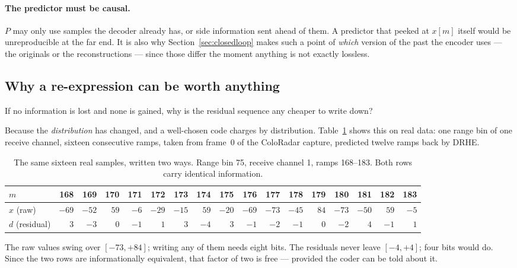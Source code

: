 \paragraph{The predictor must be causal.}
$P$ may only use samples the decoder already has, or side information sent
ahead of them. A predictor that peeked at $x[m]$ itself would be
unreproducible at the far end. It is also why Section~\ref{sec:closedloop}
makes such a point of \emph{which} version of the past the encoder uses ---
the originals or the reconstructions --- since those differ the moment anything
is not exactly lossless.

\subsection{Why a re-expression can be worth anything}

If no information is lost and none is gained, why is the residual sequence any
cheaper to write down?

Because the \emph{distribution} has changed, and a well-chosen code charges by
distribution. Table~\ref{tab:rawvsresid} shows this on real data: one range bin
of one receive channel, sixteen consecutive ramps, taken from frame~0 of the
ColoRadar capture, predicted twelve ramps back by DRHE.

\begin{table}[t]
\centering
\caption[Raw values against residuals]{The same sixteen real samples, written
two ways. Range bin 75, receive channel 1, ramps 168--183. Both rows carry
identical information.}
\label{tab:rawvsresid}
\small
\setlength{\tabcolsep}{3.4pt}
\begin{tabular}{@{}l*{16}{r}@{}}
\toprule
$m$ & 168 & 169 & 170 & 171 & 172 & 173 & 174 & 175 & 176 & 177 & 178 & 179 & 180 & 181 & 182 & 183\\
\midrule
$x$ (raw) & $-69$ & $-52$ & $59$ & $-6$ & $-29$ & $-15$ & $59$ & $-20$ & $-69$ & $-73$ & $-45$ & $84$ & $-73$ & $-50$ & $59$ & $-5$\\
$d$ (residual) & $3$ & $-3$ & $0$ & $-1$ & $1$ & $3$ & $-4$ & $3$ & $-1$ & $-2$ & $-1$ & $0$ & $-2$ & $4$ & $-1$ & $1$\\
\bottomrule
\end{tabular}
\end{table}

The raw values swing over $[-73, +84]$; writing any of them needs eight bits.
The residuals never leave $[-4, +4]$; four bits would do. Since the two rows
are informationally equivalent, that factor of two is free --- provided the
coder can be told about it.

